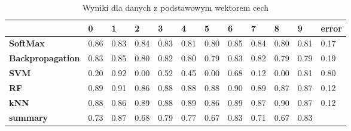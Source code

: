 \documentclass{article}
\begin{document}
\begin{table}[htp]
	\centering
	\caption{Wyniki dla danych z podstawowym wektorem cech}
	\label{basic-vector-results}
\begin{tabular}{l|l|l|l|l|l|l|l|l|l|l|l|}
	\cline{2-12}
	& \textbf{0} & \textbf{1} & \textbf{2} & \textbf{3} & \textbf{4} & \textbf{5} & \textbf{6} & \textbf{7} & \textbf{8} & \textbf{9} & \textbf{error} \\ \hline
	\multicolumn{1}{|l|}{\textbf{SoftMax}}         & 0.86       & 0.83       & 0.84       & 0.83       & 0.81       & 0.80       & 0.85       & 0.84       & 0.80       & 0.81       & 0.17                \\ \hline
	\multicolumn{1}{|l|}{\textbf{Backpropagation}} & 0.83       & 0.85       & 0.80       & 0.82       & 0.80       & 0.79       & 0.83       & 0.82       & 0.79       & 0.79       & 0.19                \\ \hline
	\multicolumn{1}{|l|}{\textbf{SVM}}             & 0.20       & 0.92       & 0.00       & 0.52       & 0.45       & 0.00       & 0.68       & 0.12       & 0.00       & 0.81       & 0.80                \\ \hline
	\multicolumn{1}{|l|}{\textbf{RF}}              & 0.89       & 0.91       & 0.86       & 0.88       & 0.88       & 0.88       & 0.90       & 0.89       & 0.87       & 0.87       & 0.12                \\ \hline
	\multicolumn{1}{|l|}{\textbf{kNN}}             & 0.88       & 0.86       & 0.89       & 0.88       & 0.89       & 0.86       & 0.89       & 0.87       & 0.90       & 0.87       & 0.12                \\ \hline
	\multicolumn{1}{|l|}{\textbf{summary}}         & 0.73       & 0.87       & 0.68       & 0.79       & 0.77       & 0.67       & 0.83       & 0.71       & 0.67       & 0.83       &                     \\ \hline
\end{tabular}
\end{table}
\end{document}

